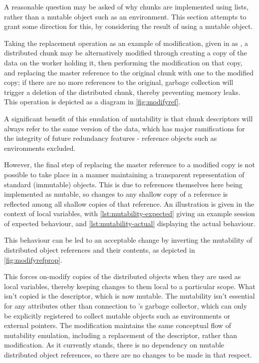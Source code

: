 A reasonable question may be asked of why chunks are implemented using lists, rather than a mutable object such as an environment.
This section attempts to grant some direction for this, by considering the result of using a mutable object.

Taking the replacement operation as an example of modification, given in \R{} as , a distributed chunk may be alternatively modified through creating a copy of the data on the worker holding it, then performing the modification on that copy, and replacing the master reference to the original chunk with one to the modified copy; if there are no more references to the original, garbage collection will trigger a deletion of the distributed chunk, thereby preventing memory leaks.
This operation is depicted as a diagram in \cref{fig:modifyref}.


A significant benefit of this emulation of mutability is that chunk descriptors will always refer to the same version of the data, which has major ramifications for the integrity of future redundancy features - reference objects such as environments excluded.

However, the final step of replacing the master reference to a modified copy is not possible to take place in a manner maintaining a transparent representation of standard (immutable) \R{} objects.
This is due to references themselves here being implemented as mutable, so changes to any shallow copy of a reference is reflected among all shallow copies of that reference.
An illustration is given in the context of local variables, with \cref{lst:mutability-expected} giving an example \R{} session of expected behaviour, and \cref{lst:mutability-actual} displaying the actual behaviour.



This behaviour can be led to an acceptable change by inverting the mutability of distributed object references and their contents, as depicted in \cref{fig:modifyrefprop}.


This forces on-modify copies of the distributed objects when they are used as local variables, thereby keeping changes to them local to a particular scope.
What isn't copied is the descriptor, which is now mutable.
The mutability isn't essential for any attributes other than connection to \R{}'s garbage collector, which can only be explicitly registered to collect mutable objects such as environments or external pointers.
The modification maintains the same conceptual flow of mutability emulation, including a replacement of the descriptor, rather than modification.
As it currently stands, there is no \lsr{} dependency on mutable distributed object references, so there are no changes to be made in that respect.

